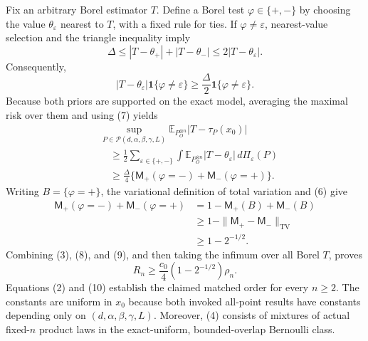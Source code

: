 Fix an arbitrary Borel estimator \(T\).  Define a Borel test \(\varphi\in\{+,-\}\) by choosing the value \(\theta_\varepsilon\) nearest to \(T\), with a fixed rule for ties.  If \(\varphi\ne\varepsilon\), nearest-value selection and the triangle inequality imply
\[
 \Delta
 \le |T-\theta_+|+|T-\theta_-|
 \le 2|T-\theta_\varepsilon|.
\]
Consequently,
\[
 |T-\theta_\varepsilon|\mathbf 1\{\varphi\ne\varepsilon\}
 \ge\frac{\Delta}{2}\mathbf 1\{\varphi\ne\varepsilon\}.     \tag{7}
\]
Because both priors are supported on the exact model, averaging the maximal risk over them and using (7) yields
\[
\begin{aligned}
 &\sup_{P\in\mathcal P(d,\alpha,\beta,\gamma,L)}
 \mathbb E_{P_O^{\otimes n}}|T-\tau_P(x_0)|\\
 &\quad\ge
 \frac12\sum_{\varepsilon\in\{+,-\}}
 \int \mathbb E_{P_O^{\otimes n}}|T-\theta_\varepsilon|\,
 d\Pi_\varepsilon(P)\\
 &\quad\ge
 \frac{\Delta}{4}
 \{\mathsf M_+(\varphi=-)+\mathsf M_-(\varphi=+)\}.             \tag{8}
\end{aligned}
\]
Writing \(B=\{\varphi=+\}\), the variational definition of total variation and (6) give
\[
\begin{aligned}
 \mathsf M_+(\varphi=-)+\mathsf M_-(\varphi=+)
 &=1-\mathsf M_+(B)+\mathsf M_-(B)\\
 &\ge1-\|\mathsf M_+-\mathsf M_-\|_{\mathrm{TV}}\\
 &\ge1-2^{-1/2}.                                                  \tag{9}
\end{aligned}
\]
Combining (3), (8), and (9), and then taking the infimum over all Borel \(T\), proves
\[
 R_n\ge \frac{c_0}{4}(1-2^{-1/2})\rho_n.                        \tag{10}
\]
Equations (2) and (10) establish the claimed matched order for every \(n\ge2\).  The constants are uniform in \(x_0\) because both invoked all-point results have constants depending only on \((d,\alpha,\beta,\gamma,L)\).  Moreover, (4) consists of mixtures of actual fixed-\(n\) product laws in the exact-uniform, bounded-overlap Bernoulli class.

